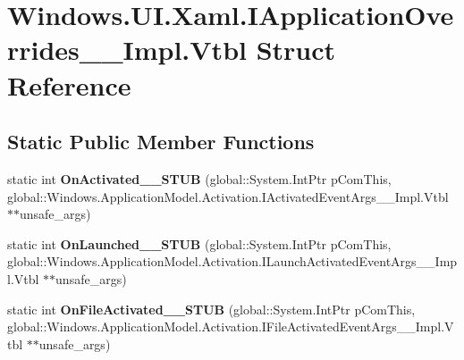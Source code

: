\hypertarget{struct_windows_1_1_u_i_1_1_xaml_1_1_i_application_overrides_____impl_1_1_vtbl}{}\section{Windows.\+U\+I.\+Xaml.\+I\+Application\+Overrides\+\_\+\+\_\+\+Impl.\+Vtbl Struct Reference}
\label{struct_windows_1_1_u_i_1_1_xaml_1_1_i_application_overrides_____impl_1_1_vtbl}
\subsection*{Static Public Member Functions}
\begin{DoxyCompactItemize}
\item 
\mbox{\label{struct_windows_1_1_u_i_1_1_xaml_1_1_i_application_overrides_____impl_1_1_vtbl_ad7464db51bad65770e0db03c4757bea2}} 
static int {\bfseries On\+Activated\+\_\+\+\_\+\+S\+T\+UB} (global\+::\+System.\+Int\+Ptr p\+Com\+This, global\+::\+Windows.\+Application\+Model.\+Activation.\+I\+Activated\+Event\+Args\+\_\+\+\_\+\+Impl.\+Vtbl $\ast$$\ast$unsafe\+\_\+args)
\item 
\mbox{\label{struct_windows_1_1_u_i_1_1_xaml_1_1_i_application_overrides_____impl_1_1_vtbl_a944ece0dc877dd124e6eef44bd7f1aea}} 
static int {\bfseries On\+Launched\+\_\+\+\_\+\+S\+T\+UB} (global\+::\+System.\+Int\+Ptr p\+Com\+This, global\+::\+Windows.\+Application\+Model.\+Activation.\+I\+Launch\+Activated\+Event\+Args\+\_\+\+\_\+\+Impl.\+Vtbl $\ast$$\ast$unsafe\+\_\+args)
\item 
\mbox{\label{struct_windows_1_1_u_i_1_1_xaml_1_1_i_application_overrides_____impl_1_1_vtbl_a701f7d1d809e7a764cf38c898b0faca9}} 
static int {\bfseries On\+File\+Activated\+\_\+\+\_\+\+S\+T\+UB} (global\+::\+System.\+Int\+Ptr p\+Com\+This, global\+::\+Windows.\+Application\+Model.\+Activation.\+I\+File\+Activated\+Event\+Args\+\_\+\+\_\+\+Impl.\+Vtbl $\ast$$\ast$unsafe\+\_\+args)
\item 
\mbox{\label{struct_windows_1_1_u_i_1_1_xaml_1_1_i_application_overrides_____impl_1_1_vtbl_a9d3f155c56d99f66129cb2eda5656074}} 
$$
\end{DoxyCompactItemize}
